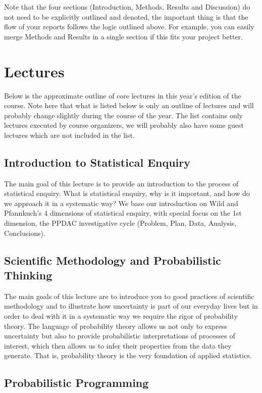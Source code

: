 \documentclass[fleqn,moreauthors,10pt]{ds_report}
\begin{document}
Note that the four sections (Introduction, Methods, Results and Discussion) do not need to be explicitly outlined and denoted, the important thing is that the flow of your reports follows the logic outlined above. For example, you can easily merge Methods and Results in a single section if this fits your project better.

\section*{Lectures}

Below is the approximate outline of core lectures in this year's edition of the course. Note here that what is listed below is only an outline of lectures and will probably change slightly during the course of the year. The list contains only lectures executed by course organizers, we will probably also have some guest lectures which are not included in the list.

\subsection*{Introduction to Statistical Enquiry}

The main goal of this lecture is to provide an introduction to the process of statistical enquiry. What is statistical enquiry, why is it important, and how do we approach it in a systematic way? We base our introduction on Wild and Pfannkuch’s 4 dimensions of statistical enquiry, with special focus on the 1st dimension, the PPDAC investigative cycle (Problem, Plan, Data, Analysis, Conclusions).

\subsection*{Scientific Methodology and Probabilistic Thinking}

The main goals of this lecture are to introduce you to good practices of scientific methodology and to illustrate how uncertainty is part of our everyday lives but in order to deal with it in a systematic way we require the rigor of probability theory. The language of probability theory allows us not only to express uncertainty but also to provide probabilistic interpretations of processes of interest, which then allows us to infer their properties from the data they generate. That is, probability theory is the very foundation of applied statistics.

\subsection*{Probabilistic Programming}
\end{document}
